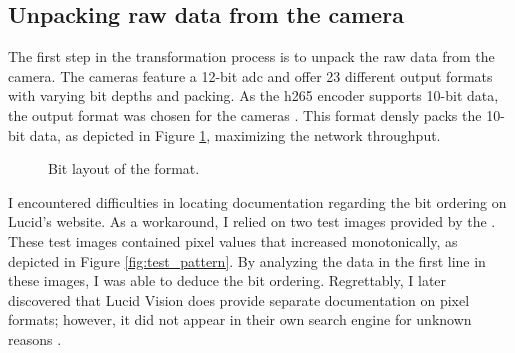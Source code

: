 \subsection {Unpacking raw data from the camera}
\label{sec:unpacking}
The first step in the transformation process is to unpack the raw data from the camera.
The \lucid cameras feature a 12-bit \gls{adc} and offer 23 different output formats with varying bit depths and packing.
As the \gls{h265} encoder supports 10-bit data, the  output format was chosen for the cameras \cite[17 ]{nvidiaNVIDIAJetsonAGX2019}.
This format densly packs the 10-bit data, as depicted in Figure \ref{fig:mono10p}, maximizing the network throughput.

\begin{figure}[H]
    \centering
    \caption{Bit layout of the  format.}
    \label{fig:mono10p}
\end{figure}

I encountered difficulties in locating documentation regarding the bit ordering on Lucid's website.
As a workaround, I relied on two test images provided by the \cam.
These test images contained pixel values that increased monotonically, as depicted in Figure \ref{fig:test_pattern}.
By analyzing the data in the first line in these images, I was able to deduce the bit ordering.
Regrettably, I later discovered that Lucid Vision does provide separate documentation on pixel formats; however, it did not appear in their own search engine for unknown reasons \cite{lucidvisionlabsPixelFormatsLUCID2020}.


